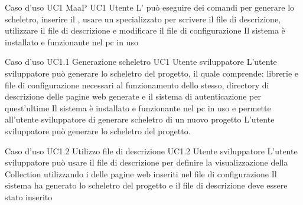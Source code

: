 \UCtitle
{Caso d'uso UC1}
{MaaP}
\UC
{UC1}
{Utente }
{L'  può eseguire dei comandi per generare lo scheletro, inserire il , usare un  specializzato per scrivere il file di descrizione, utilizzare il file di descrizione e modificare il file di configurazione}
{Il sistema è installato e funzionante nel pc in uso}

\UCtitle
{Caso d'uso UC1.1}
{Generazione scheletro}
\UC
{UC1}
{Utente sviluppatore}
{L'utente sviluppatore può generare lo scheletro del progetto, il quale comprende: librerie e file di configurazione necessari al funzionamento dello stesso, directory di descrizione delle pagine web generate e il sistema di autenticazione per quest'ultime}
{Il sistema è installato e funzionante nel pc in uso e permette all'utente sviluppatore di generare scheletro di un nuovo progetto}
\scenario
{L'utente sviluppatore può generare lo scheletro del progetto.}



\UCtitle
{Caso d'uso UC1.2}
{Utilizzo file di descrizione}
\UC
{UC1.2}
{Utente sviluppatore}
{L'utente sviluppatore  può usare il file di descrizione per definire la visualizzazione della Collection utilizzando i  delle pagine web inseriti nel file di configurazione}
{Il sistema ha generato lo scheletro del progetto e il file di descrizione deve essere stato inserito}

